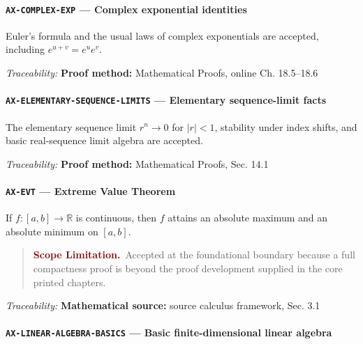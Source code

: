 \documentclass[10pt]{article}
\newcommand{\pidraw}[1]{\begingroup\urlstyle{tt}\nolinkurl{#1}\endgroup}
\theoremstyle{definition}
\theoremstyle{remark}
\newenvironment{scopelimitation}
{\begin{quote}\small\noindent\textbf{\textcolor{darkred}{Scope Limitation.}}\ }
{\end{quote}}
\begin{document}
\paragraph{\pidraw{AX-COMPLEX-EXP} --- Complex exponential identities}

Euler's formula and the usual laws of complex exponentials are accepted, including $e^{u+v}=e^u e^v$.

\smallskip\noindent\textit{Traceability:} \textbf{Proof method:} Mathematical Proofs, online Ch. 18.5--18.6\par

\label{prf:AX-ELEMENTARY-SEQUENCE-LIMITS}

\paragraph{\pidraw{AX-ELEMENTARY-SEQUENCE-LIMITS} --- Elementary sequence-limit facts}

The elementary sequence limit $r^n\to0$ for $|r|<1$, stability under index shifts, and basic real-sequence limit algebra are accepted.

\smallskip\noindent\textit{Traceability:} \textbf{Proof method:} Mathematical Proofs, Sec. 14.1\par

\label{prf:AX-EVT}

\paragraph{\pidraw{AX-EVT} --- Extreme Value Theorem}

If $f:[a,b]\to\mathbb{R}$ is continuous, then $f$ attains an absolute maximum and an absolute minimum on $[a,b]$.

\begin{scopelimitation}Accepted at the foundational boundary because a full compactness proof is beyond the proof development supplied in the core printed chapters.\end{scopelimitation}

\smallskip\noindent\textit{Traceability:} \textbf{Mathematical source:} source calculus framework, Sec. 3.1\par

\label{prf:AX-LINEAR-ALGEBRA-BASICS}

\paragraph{\pidraw{AX-LINEAR-ALGEBRA-BASICS} --- Basic finite-dimensional linear algebra}
\end{document}
